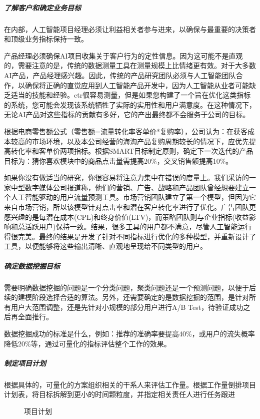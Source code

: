 \documentclass[letterpaper,10pt,english]{sphinxmanual}
\begin{document}
\subparagraph{了解客户和确定业务目标}
\label{\detokenize{chapter_project/process:id15}}
在内部，人工智能项目经理必须让利益相关者参与进来，以确保与最重要的决策者和顶级业务指标保持一致。

产品经理必须确保AI项目收集关于客户行为的定性信息。因为这可能不是直观的，需要注意的是，传统的数据测量工具在测量规模上比情绪更有效。对于大多数AI产品，产品经理感兴趣。因此，传统的产品研究团队必须与人工智能团队合作，以确保将正确的直觉应用到人工智能产品开发中，因为人工智能从业者可能缺乏适当的技能和经验。ctr很容易测量，但是如果您构建了一个旨在优化这类指标的系统，您可能会发现该系统牺牲了实际的实用性和用户满意度。在这种情况下，无论AI产品对这些指标的贡献有多好，它的产出最终都不会服务于公司的目标。

根据电商零售额公式（零售额=流量转化率客单价*复购率），公司认为：在获客成本较高的市场环境，以及本公司经营的海淘产品复购周期较长的情况下，应优先提高转化率和客单价两项指标。根据SMART目标制定原则，确定下一次迭代的产品目标为：猜你喜欢模块中的商品点击量需提高20\%，交叉销售额提高10\%。

如果你没有做适当的研究，你很容易将注意力集中在错误的度量上。我们采访的一家中型数字媒体公司报道称，他们的营销、广告、战略和产品团队曾经想要建立一个人工智能驱动的用户流量预测工具。市场营销团队建立了第一个模型，但因为它来自市场营销，所以该模型针对点击率和潜在客户转化率进行了优化。广告团队更感兴趣的是每潜在成本(CPL)和终身价值(LTV)，而策略团队则与企业指标(收益影响和总活跃用户)保持一致。结果，很多工具的用户都不满意，尽管人工智能运行得很完美。最终的结果是开发了针对不同指标进行优化的多种模型，并重新设计了工具，以便能够将这些输出清晰、直观地呈现给不同类型的用户。


\subparagraph{确定数据挖掘目标}
\label{\detokenize{chapter_project/process:id16}}
需要明确数据挖掘的问题是一个分类问题，聚类问题还是一个预测问题，以便于后续的建模阶段选择合适的算法。另外，还需要确定的是数据挖掘的范围，是针对所有用户大范围调整，还是先针对小规模的部分用户进行A/B
Test，待验证成功之后再全面推行。

数据挖掘成功的标准是什么，例如：推荐的准确率要提高40\%，或用户的流失概率降低20\%等，通过可量化的指标评估整个工作的效果。


\subparagraph{制定项目计划}
\label{\detokenize{chapter_project/process:id17}}
根据具体的，可量化的方案组织相关的干系人来评估工作量。根据工作量倒排项目计划表，将目标拆解到更小的时间颗粒度，并指定相关责任人进行任务跟进

\begin{figure}[H]
\centering
\capstart

\noindent{}
\caption{项目计划}\label{\detokenize{chapter_project/process:id36}}\end{figure}
\end{document}
